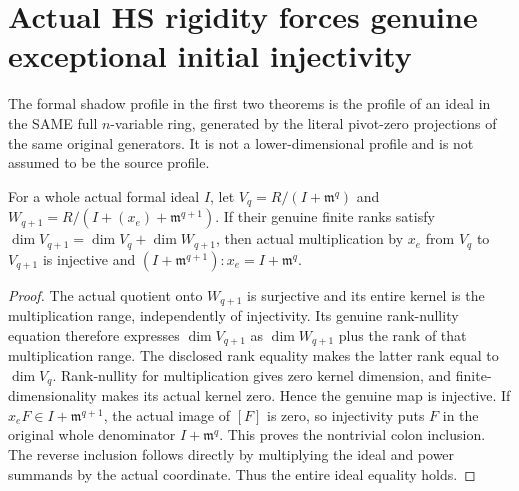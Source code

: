 \section{Actual HS rigidity forces genuine exceptional initial injectivity}

The formal shadow profile in the first two theorems is the profile of
an ideal in the SAME full $n$-variable ring, generated by the literal
pivot-zero projections of the same original generators. It is not a
lower-dimensional profile and is not assumed to be the source profile.

\begin{theorem}
\label{hir:actual-exceptional-jet-rank-injectivity-converse}
\leanok
For a whole actual formal ideal $I$, let $V_q=R/(I+\mathfrak m^q)$
and $W_{q+1}=R/(I+(x_e)+\mathfrak m^{q+1})$. If their genuine finite
ranks satisfy $\dim V_{q+1}=\dim V_q+\dim W_{q+1}$, then actual
multiplication by $x_e$ from $V_q$ to $V_{q+1}$ is injective and
$(I+\mathfrak m^{q+1}):x_e=I+\mathfrak m^q$.
\end{theorem}
\begin{proof}
The actual quotient onto $W_{q+1}$ is surjective and its entire kernel
is the multiplication range, independently of injectivity. Its genuine
rank-nullity equation therefore expresses $\dim V_{q+1}$ as
$\dim W_{q+1}$ plus the rank of that multiplication range. The disclosed
rank equality makes the latter rank equal to $\dim V_q$. Rank-nullity
for multiplication gives zero kernel dimension, and finite-dimensionality
makes its actual kernel zero. Hence the genuine map is injective.
If $x_eF\in I+\mathfrak m^{q+1}$, the actual image of $[F]$ is zero,
so injectivity puts $F$ in the original whole denominator
$I+\mathfrak m^q$. This proves the nontrivial colon inclusion. The
reverse inclusion follows directly by multiplying the ideal and power
summands by the actual coordinate. Thus the entire ideal equality holds.
\end{proof}

